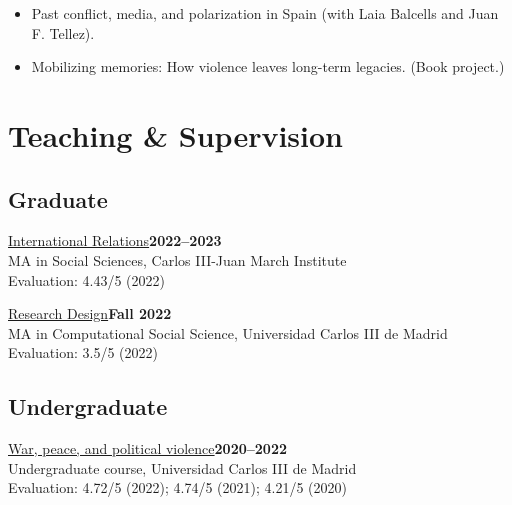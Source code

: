 \documentclass[a4paper, 12pt]{article}
\begin{document}
\begin{itemize}[leftmargin=*, nolistsep]
\item Past conflict, media, and polarization in Spain (with Laia Balcells and Juan F. Tellez).
\item Mobilizing memories: How violence leaves long-term legacies. (Book project.)
\end{itemize}

\section*{Teaching \& Supervision}


\subsection*{Graduate}

\noindent
\href{https://raw.githack.com/franvillamil/syllabi/master/current/syllabus_IR.pdf}{International Relations}\hfill\textbf{2022--2023}\\
{\small MA in Social Sciences, Carlos III-Juan March Institute}\\
{\small Evaluation: 4.43/5 (2022)}
\vspace{10pt}

\noindent
\href{https://github.com/franvillamil/syllabi/blob/master/current/syllabus_research_design.pdf}{Research Design}\hfill\textbf{Fall 2022}\\
{\small MA in Computational Social Science, Universidad Carlos III de Madrid}\\
{\small Evaluation: 3.5/5 (2022)}

\vspace{-10pt}
\subsection*{Undergraduate}

\noindent
\href{https://github.com/franvillamil/syllabi/blob/master/current/syllabus_war_peace_political_violence.pdf}{War, peace, and political violence}\hfill\textbf{2020--2022}\\
{\small Undergraduate course, Universidad Carlos III de Madrid}\\
{\small Evaluation: 4.72/5 (2022); 4.74/5 (2021); 4.21/5 (2020)}
\vspace{10pt}
\end{document}
